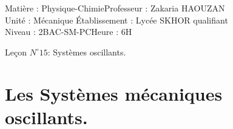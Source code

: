 \documentclass[12pt]{article}
\author{Zakaria HAOUZAN}
\date{\today}
\newcommand\headerMe[2]{\noindent{}#1\hfill#2}
\begin{document}
\headerMe{Matière : Physique-Chimie}{Professeur : Zakaria HAOUZAN}\\
\headerMe{Unité : Mécanique }{Établissement : Lycée SKHOR qualifiant}\\
\headerMe{Niveau : 2BAC-SM-PC}{Heure : 6H}\\

\begin{center}

    \Large{Leçon $N^{\circ} 15 $: \color{red}Systèmes oscillants.}
\end{center}


\section{Les Systèmes mécaniques oscillants.}
\end{document}

